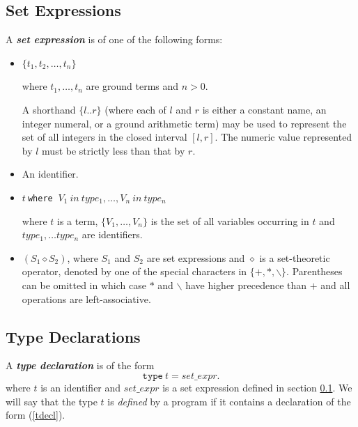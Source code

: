 \documentclass[a4paper,10pt]{article}
\begin{document}
\subsection{Set Expressions}\label{sexpr}

A \textbf{\textit{set expression}}  is of one of the following forms:
\begin{itemize}
\item $\{t_1,t_2, \ldots, t_n\}$

 where $t_1,\ldots,t_n$ are ground terms and $n>0$. 

A shorthand $\{l..r\}$ (where each of $l$ and $r$ is either a constant name, an integer numeral, or a ground arithmetic term) may be used to represent the  set of all integers in the closed interval $[l, r]$. The numeric value represented by $l$ must be strictly less than that by $r$.


\item An identifier.
\item $t~$\texttt{where} $~V_1~in~type_1,\ldots, V_n~in~type_n$
 
where $t$ is a term, $\{V_1, \ldots, V_n\}$ is the set of all variables occurring in $t$ and $type_1, \ldots type_n$ are identifiers. 

\item $(S_1 \diamond S_2)$, where $S_1$ and $S_2$ are set expressions and $\diamond$ is a set-theoretic operator, denoted by one of the special characters in $\{+, *, \backslash \}$. Parentheses can be omitted in which case $*$ and $\backslash$ have higher precedence than $+$ and all operations are left-associative.
\end{itemize}

\subsection{Type Declarations}
A \textit{\textbf{type declaration}} is of the form 
\begin{equation}\label{tdecl}
\texttt{type}~t = set\_expr.
\end{equation}
where $t$ is an identifier and $set\_expr$ is a set expression defined in section \ref{sexpr}.
We will say that the type $t$ is \textit{defined} by a program if it contains a declaration of the form (\ref{tdecl}). 
\end{document}
